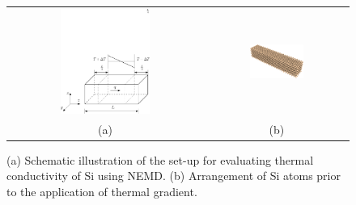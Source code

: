  
 \begin{center}
\begin{figure}[p]
\begin{tabular}{cc}
  \includegraphics[width=0.48\textwidth]{./Figures/schematic}
  &
  \hspace{3mm}
  \includegraphics[width=0.40\textwidth]{./Figures/Sibar_05}
  \\ (a) & (b)
  \end{tabular}
\caption{(a) Schematic illustration of the set-up for evaluating thermal conductivity of Si using NEMD. (b) 
Arrangement of Si atoms prior to the application of thermal gradient.}
\label{fig:setup}
\end{figure}
\end{center}

\clearpage


